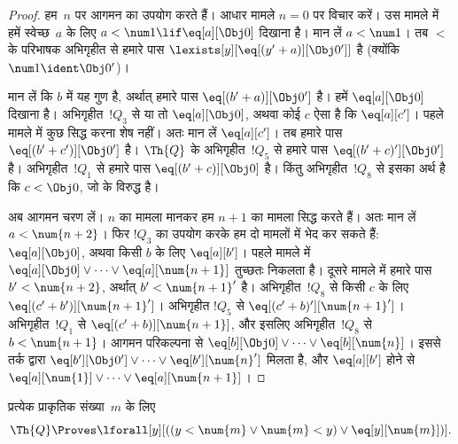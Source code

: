 \documentclass[../../../include/open-logic-section]{subfiles}
\begin{document}
\begin{proof}
हम~$n$ पर आगमन का उपयोग करते हैं। आधार मामले $n = 0$ पर विचार करें। उस
मामले में हमें स्वेच्छ~$a$ के लिए
$a < \num 1 \lif \eq[a][\Obj 0]$ दिखाना है। मान लें $a < \num 1$। तब
$<$ के परिभाषक अभिगृहीत से हमारे पास
$\lexists[y][\eq[(y'+a)][\Obj 0']]$ है (क्योंकि
$\num 1 \ident \Obj 0'$)।

मान लें कि $b$ में यह गुण है, अर्थात् हमारे पास
$\eq[(b'+a)][\Obj 0']$ है। हमें $\eq[a][\Obj 0]$ दिखाना है। अभिगृहीत~$!Q_3$
से या तो $\eq[a][\Obj 0]$, अथवा कोई $c$ ऐसा है कि $\eq[a][c']$। पहले
मामले में कुछ सिद्ध करना शेष नहीं। अतः मान लें $\eq[a][c']$। तब हमारे पास
$\eq[(b' + c')][\Obj 0']$ है। $\Th{Q}$ के अभिगृहीत~$!Q_5$ से हमारे पास
$\eq[(b'+c)'][\Obj 0']$ है। अभिगृहीत~$!Q_1$ से हमारे पास
$\eq[(b' + c)][\Obj 0]$ है। किंतु अभिगृहीत~$!Q_8$ से इसका अर्थ है कि
$c < \Obj 0$, जो  के विरुद्ध है।

अब आगमन चरण लें। $n$ का मामला मानकर हम $n+1$ का मामला सिद्ध करते हैं।
अतः मान लें $a < \num {n+2}$। फिर $!Q_3$ का उपयोग करके हम दो मामलों में
भेद कर सकते हैं: $\eq[a][\Obj 0]$, अथवा किसी $b$ के लिए $\eq[a][b']$।
पहले मामले में
$\eq[a][\Obj 0] \lor \dots \lor \eq[a][\num{n+1}]$ तुच्छतः निकलता है।
दूसरे मामले में हमारे पास $b' < \num {n+2}$, अर्थात्
$b' < \num{n+1}'$ है। अभिगृहीत~$!Q_8$ से किसी $c$ के लिए
$\eq[(c'+b')][\num{n+1}']$। अभिगृहीत $!Q_5$ से
$\eq[(c'+b)'][\num{n+1}']$। अभिगृहीत~$!Q_1$ से
$\eq[(c'+b)][\num{n+1}]$, और इसलिए अभिगृहीत~$!Q_8$ से
$b < \num{n+1}$। आगमन परिकल्पना से
$\eq[b][\Obj 0] \lor \dots \lor \eq[b][\num{n}]$। इससे तर्क द्वारा
$\eq[b'][\Obj 0'] \lor \dots \lor \eq[b'][\num{n}']$ मिलता है, और
$\eq[a][b']$ होने से
$\eq[a][\num{1}] \lor \dots \lor \eq[a][\num{n+1}]$।
\end{proof}

\begin{lem}
   प्रत्येक प्राकृतिक संख्या~$m$ के लिए
  \[
  \Th{Q} \Proves
  \lforall[y][((y < \num{m} \lor \num{m} < y) \lor \eq[y][\num{m}])].
  \]
\end{lem}
\end{document}
